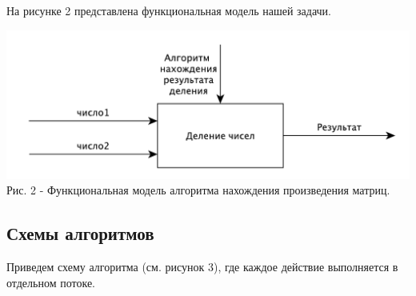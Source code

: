 \documentclass[a4paper,14pt]{article} %
\begin{document}
	На рисунке 2 представлена функциональная модель нашей задачи.  
	
	\begin{center}
		\includegraphics[scale = 0.8]{idef0} \\ Рис.  2 - Функциональная модель алгоритма нахождения произведения матриц. 
	\end{center}
	        
        \subsection{Схемы алгоритмов}
        \hfill
        
         Приведем схему алгоритма (см. рисунок 3), где каждое действие выполняется в отдельном потоке. 
         
        \hfill

	\hfill
	
\end{document}

